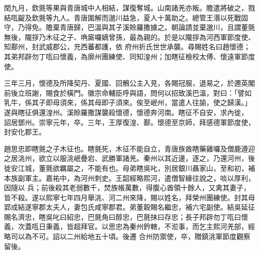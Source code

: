 \begin{pinyinscope}
 閏九月，欽氈等果與青唐城中人相結，謀復奪城。山南諸羌亦叛。贍遣將破之，戮結咓齪及欽氈等九人。青唐圍解而邈川益急，夏人十萬助之。總管王湣以死戰固守，乃得免。贍棄青唐歸，巴溫與其子溪賒羅撒據之。朝論請並棄邈川，且謂董氈無後，隴拶乃木征之子、唃廝囉嫡曾孫，最為親的。於是以隴拶為河西軍節度使、知鄯州，封武威郡公，充西蕃都護，依
 府州折氏世世承襲。尋賜姓名曰趙懷德；其弟邦辟勿丁咓曰懷義，為廓州團練使、同知湟州；加瞎征檢校太傅、懷遠軍節度使。



 三年三月，懷德及所降契丹、夏國、回鶻公主入見，各賜冠服，退易之，於邇英閣前後立班謝，賜食於橫門。徽宗命輔臣呼與語，問何以招致溪巴溫，對曰：「譬如乳牛，係其子即母須來，係其母即子須來。俟至岷州，當遣人往諭，使之歸漢。」遂與瞎征俱還湟州。溪賒羅撒謀襲殺懷德，懷德奔河南。瞎征不自安，求內徙，
 詔居鄧州。崇寧元年，卒。三年，王厚復湟、鄯。懷德至京師，拜感德軍節度使，封安化郡王。



 趙思忠即瞎氈之子木征也。瞎氈死，木征不能自立，青唐族酋瞎藥雞囉及僧鹿遵迎之居洮州，欲立以服洮岷疊宕、武勝軍諸羌。秦州以其近邊，逐之，乃還河州，後徙安江城，董氈欲羈屬之，不能有也。母弟瞎吳叱，別居銀川聶家山，至和初，補本族副軍主。嘉祐中，為河州刺史。王韶經略熙河，遣僧智緣往說之，啖以厚利，因隨以
 兵；前後殺其老弱數千，焚族帳萬數，得腹心酋領十餘人，又禽其妻子，皆不殺。遂以熙寧七年四月舉洮、河二州來降，賜以姓名，拜榮州團練使。封其母郢成結遂寧郡太夫人，妻包氏咸寧郡君。弟董穀賜名繼忠，補六宅副使。結吳延征賜名濟忠，瞎吳叱曰紹忠，巴氈角曰醇忠，巴氈抹曰存忠；長子邦辟勿丁咓曰懷義，次蓋咓日秉義，皆超拜官。以思忠為秦州鈐轄，不涖事，而乞主熙河羌部，經略司以為不可。詔以二州給地五十頃。後遷
 合州防禦使，卒，贈鎮洮軍節度觀察留後。



\end{pinyinscope}